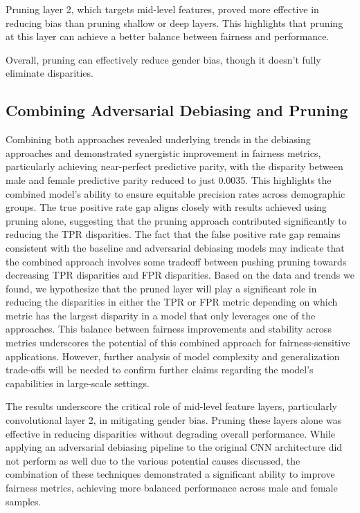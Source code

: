\documentclass[11pt]{article}
\begin{document}
Pruning layer 2, which targets mid-level features, proved more effective in reducing bias than pruning shallow or deep layers. This highlights that pruning at this layer can achieve a better balance between fairness and performance.

Overall, pruning can effectively reduce gender bias, though it doesn't fully eliminate disparities.

\subsection{Combining Adversarial Debiasing and Pruning}

Combining both approaches revealed underlying trends in the debiasing approaches and demonstrated synergistic improvement in fairness metrics, particularly achieving near-perfect predictive parity, with the disparity between male and female predictive parity reduced to just 0.0035. This highlights the combined model's ability to ensure equitable precision rates across demographic groups. The true positive rate gap aligns closely with results achieved using pruning alone, suggesting that the pruning approach contributed significantly to reducing the TPR disparities. The fact that the false positive rate gap remains consistent with the baseline and adversarial debiasing models may indicate that the combined approach involves some tradeoff between pushing pruning towards decreasing TPR disparities and FPR disparities. Based on the data and trends we found, we hypothesize that the pruned layer will play a significant role in reducing the disparities in either the TPR or FPR metric depending on which metric has the largest disparity in a model that only leverages one of the approaches. This balance between fairness improvements and stability across metrics underscores the potential of this combined approach for fairness-sensitive applications. However, further analysis of model complexity and generalization trade-offs will be needed to confirm further claims regarding the model's capabilities in large-scale settings.

The results underscore the critical role of mid-level feature layers, particularly convolutional layer 2, in mitigating gender bias. Pruning these layers alone was effective in reducing disparities without degrading overall performance. While applying an adversarial debiasing pipeline to the original CNN architecture did not perform as well due to the various potential causes discussed, the combination of these techniques demonstrated a significant ability to improve fairness metrics, achieving more balanced performance across male and female samples.
\end{document}
